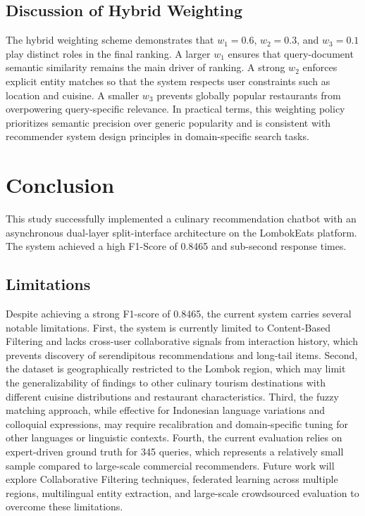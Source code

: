 \documentclass[conference]{IEEEtran}
\begin{document}
\subsection{Discussion of Hybrid Weighting}
The hybrid weighting scheme demonstrates that $w_1 = 0.6$, $w_2 = 0.3$, and $w_3 = 0.1$ play distinct roles in the final ranking. A larger $w_1$ ensures that query-document semantic similarity remains the main driver of ranking. A strong $w_2$ enforces explicit entity matches so that the system respects user constraints such as location and cuisine. A smaller $w_3$ prevents globally popular restaurants from overpowering query-specific relevance. In practical terms, this weighting policy prioritizes semantic precision over generic popularity and is consistent with recommender system design principles in domain-specific search tasks\cite{b1,b6,b8,b10,b11,b15}.

\section{Conclusion}
This study successfully implemented a culinary recommendation chatbot with an asynchronous dual-layer split-interface architecture on the LombokEats platform\cite{b16}. The system achieved a high F1-Score of 0.8465 and sub-second response times\cite{b14}. 

\subsection*{Limitations}
Despite achieving a strong F1-score of 0.8465, the current system carries several notable limitations. First, the system is currently limited to Content-Based Filtering and lacks cross-user collaborative signals from interaction history, which prevents discovery of serendipitous recommendations and long-tail items. Second, the dataset is geographically restricted to the Lombok region, which may limit the generalizability of findings to other culinary tourism destinations with different cuisine distributions and restaurant characteristics. Third, the fuzzy matching approach, while effective for Indonesian language variations and colloquial expressions, may require recalibration and domain-specific tuning for other languages or linguistic contexts. Fourth, the current evaluation relies on expert-driven ground truth for 345 queries, which represents a relatively small sample compared to large-scale commercial recommenders. Future work will explore Collaborative Filtering techniques, federated learning across multiple regions, multilingual entity extraction, and large-scale crowdsourced evaluation to overcome these limitations\cite{b10,b16}.
\end{document}
